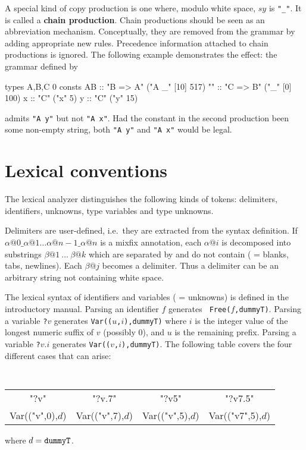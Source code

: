 A special kind of copy production is one where, modulo white space, $sy$ is
{\tt"_"}.  It is called a {\bf chain production}.  Chain productions should be
seen as an abbreviation mechanism.  Conceptually, they are removed from the
grammar by adding appropriate new rules.  Precedence information attached to
chain productions is ignored.  The following example demonstrates the effect:
the grammar defined by
\begin{ttbox}
types A,B,C 0
consts AB :: "B => A"  ("A _" [10] 517)
       "" :: "C => B"  ("_"   [0]  100)
       x  :: "C"       ("x"          5)
       y  :: "C"       ("y"         15)
\end{ttbox}
admits {\tt"A y"} but not {\tt"A x"}.  Had the constant in the second
production been some non-empty string, both {\tt"A y"} and {\tt"A x"} would
be legal.


\section{Lexical conventions}

The lexical analyzer distinguishes the following kinds of tokens: delimiters,
identifiers, unknowns, type variables and type unknowns.

Delimiters are user-defined, i.e.\ they are extracted from the syntax
definition.  If $\alpha@0\_\alpha@1\dots\alpha@{n-1}\_\alpha@n$ is a mixfix
annotation, each $\alpha@i$ is decomposed into substrings
$\beta@1~\dots~\beta@k$ which are separated by and do not contain
 ( = blanks, tabs, newlines).  Each $\beta@j$ becomes a
delimiter.  Thus a delimiter can be an arbitrary string not containing white
space.

The lexical syntax of identifiers and variables ( = unknowns) is defined in
the introductory manual.  Parsing an identifier $f$ generates {\tt
  Free($f$,dummyT)}.  Parsing a variable {\tt?}$v$ generates
{\tt Var(($u$,$i$),dummyT)} where $i$ is the integer value of the longest
numeric suffix of $v$ (possibly $0$), and $u$ is the remaining prefix.
Parsing a variable {\tt?}$v{.}i$ generates {\tt Var(($v$,$i$),dummyT)}.  The
following table covers the four different cases that can arise:
\begin{center}\tt
\begin{tabular}{cccc}
"?v" & "?v.7" & "?v5" & "?v7.5" \\
Var(("v",0),$d$) & Var(("v",7),$d$) & Var(("v",5),$d$) & Var(("v7",5),$d$)
\end{tabular}
\end{center}
where $d = {\tt dummyT}$.

